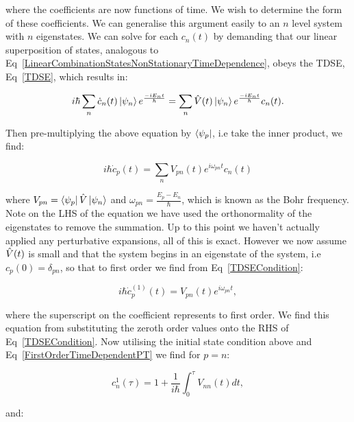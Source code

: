 \noindent where the coefficients are now functions of time. We wish to determine the form of these coefficients. We can generalise this argument easily to an $n$ level system with $n$ eigenstates. We can solve for each $c_n(t)$ by demanding that our linear superposition of states, analogous to Eq~\ref{LinearCombinationStatesNonStationaryTimeDependence}, obeys the TDSE, Eq~\ref{TDSE}, which results in:

\begin{equation}
    i \hbar \sum_n \Dot{c}_n(t) \ket{\psi_n} e^\frac{-i E_n t}{\hbar} = \sum_n \Hat{V}(t) \ket{\psi_n} e^\frac{-i E_n t}{\hbar} c_n(t).
\end{equation}

\noindent Then pre-multiplying the above equation by $\bra{\psi_p}$, i.e take the inner product, we find:

\begin{equation}
    i \hbar \Dot{c}_p(t) = \sum_n V_{pn}(t) e^{i \omega_{pn} t} c_n(t)
    \label{TDSECondition}
\end{equation}

\noindent where $V_{pn} = \bra{\psi_p} \Hat{V} \ket{\psi_n}$ and $\omega_{pn} = \frac{E_p - E_n}{\hbar}$, which is known as the Bohr frequency. Note on the LHS of the equation we have used the orthonormality of the eigenstates to remove the summation. Up to this point we haven't actually applied any perturbative expansions, all of this is exact. However we now assume $\Hat{V}(t)$ is small and that the system begins in an eigenstate of the system, i.e $c_p(0) = \delta_{pn}$, so that to first order we find from Eq~\ref{TDSECondition}:

\begin{equation}
    i \hbar \Dot{c}^{(1)}_p(t) = V_{pn}(t) e^{i \omega_{pn} t},
    \label{FirstOrderTimeDependentPT}
\end{equation}

\noindent where the superscript on the coefficient represents to first order. We find this equation from substituting the zeroth order values onto the RHS of Eq~\ref{TDSECondition}. Now utilising the initial state condition above and Eq~\ref{FirstOrderTimeDependentPT} we find for $p = n$:

\begin{equation}
    c^{1}_n(\tau) = 1 + \frac{1}{i \hbar} \int_0^\tau V_{nn}(t) dt,
    \label{CoefficientN}
\end{equation}

\noindent and:

